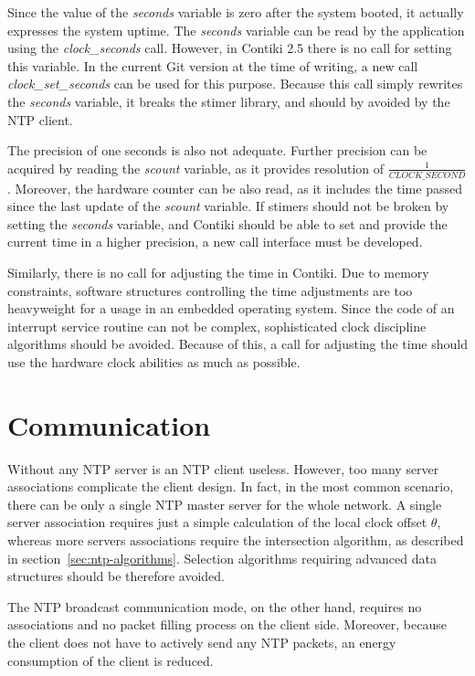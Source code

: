 Since the value of the {\it{seconds}} variable is zero after the system booted,
it actually expresses the system uptime.
The {\it{seconds}} variable can be read by the application using the {\it{clock\_seconds}} call.
However, in Contiki 2.5 there is no call for setting this variable.
In the current Git version at the time of writing, a new call {\it{clock\_set\_seconds}}
can be used for this purpose.
Because this call simply rewrites the {\it{seconds}} variable, it breaks the stimer library,
and should by avoided by the NTP client.

The precision of one seconds is also not adequate.
Further precision can be acquired by reading the {\it{scount}} variable,
as it provides resolution of $\frac{1}{CLOCK\_SECOND}$.
Moreover, the hardware counter can be also read, as it includes the time passed since
the last update of the {\it{scount}} variable.
If stimers should not be broken by setting the {\it{seconds}} variable,
and Contiki should be able to set and provide the current time in a higher precision,
a new call interface must be developed.

Similarly, there is no call for adjusting the time in Contiki.
Due to memory constraints, software structures controlling the time adjustments are too heavyweight
for a usage in an embedded operating system.
Since the code of an interrupt service routine can not be complex,
sophisticated clock discipline algorithms should be avoided.
Because of this, a call for adjusting the time should use the hardware clock abilities as much as possible.


\section{Communication}
Without any NTP server is an NTP client useless.
However, too many server associations complicate the client design.
In fact, in the most common scenario, there can be only a single NTP master server
for the whole network.
A single server association requires just a simple calculation of the local clock offset
$\theta$, whereas more servers associations require the intersection algorithm,
as described in section~\ref{sec:ntp-algorithms}.
Selection algorithms requiring advanced data structures should be therefore avoided.

The NTP broadcast communication mode, on the other hand,
requires no associations and no packet filling process on the client side.
Moreover, because the client does not have to actively send any NTP packets,
an energy consumption of the client is reduced.

